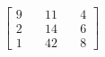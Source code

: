 \documentclass[preview]{standalone}
\begin{document}
\begin{align*}
\begin{bmatrix} 9 & \quad 11 & \quad 4 \\ 2 & \quad 14 & \quad 6 \\ 1 & \quad 42 & \quad 8 \end{bmatrix}
\end{align*}
\end{document}

